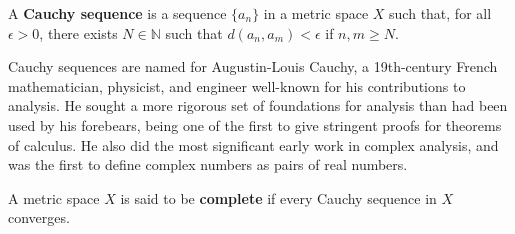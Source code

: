 \documentclass[12pt]{article}
\begin{document}
\begin{defn}
  A \textbf{Cauchy sequence} is a sequence $\{a_n\}$ in a metric space $X$ such that,
  for all $\epsilon > 0$, there exists $N \in \mathbb{N}$ such that $d(a_n,a_m) <
  \epsilon$ if $n,m \geq N$.
\end{defn}

\begin{comm}
  Cauchy sequences are named for Augustin-Louis Cauchy, a 19th-century French
  mathematician, physicist, and engineer well-known for his contributions to
  analysis. He sought a more rigorous set of foundations for analysis than had been
  used by his forebears, being one of the first to give stringent proofs for theorems
  of calculus. He also did the most significant early work in complex analysis, and
  was the first to define complex numbers as pairs of real numbers.
\end{comm}

\begin{defn}
  A metric space $X$ is said to be \textbf{complete} if every Cauchy sequence in $X$
  converges.
\end{defn}
\end{document}

